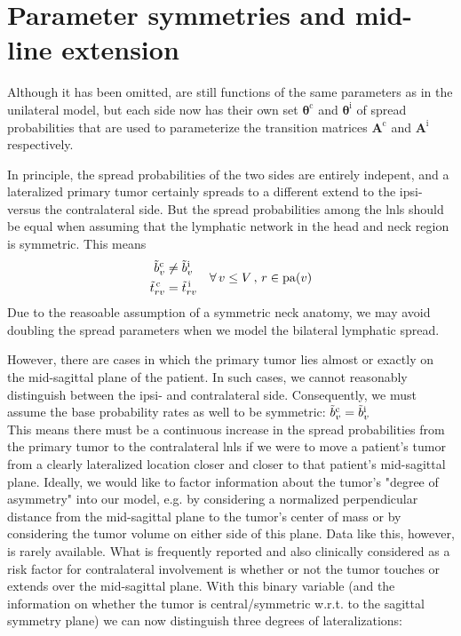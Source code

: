 \documentclass[\relativeRoot/main.tex]{subfiles}
\begin{document}
\section{Parameter symmetries and mid-line extension}
\label{sec:bilateral:parameter_symmetries}

Although it has been omitted,  are still functions of the same parameters as in the unilateral model, but each side now has their own set $\boldsymbol{\theta}^\text{c}$ and $\boldsymbol{\theta}^\text{i}$ of spread probabilities that are used to parameterize the transition matrices $\mathbf{A}^\text{c}$ and $\mathbf{A}^\text{i}$ respectively.

In principle, the spread probabilities of the two sides are entirely indepent, and a lateralized primary tumor certainly spreads to a different extend to the ipsi- versus the contralateral side. But the spread probabilities among the \glspl{lnl} should be equal when assuming that the lymphatic network in the head and neck region is symmetric. This means
%
\begin{equation}
    \begin{aligned}
        \Tilde{b}^\text{c}_v &\neq \Tilde{b}^\text{i}_v \\
        \Tilde{t}^\text{\,c}_{rv} &= \Tilde{t}^\text{\,i}_{rv}
    \end{aligned}
    \quad \forall \, v \leq V \, , \, r \in \operatorname{pa}(v)
\end{equation}
%
Due to the reasoable assumption of a symmetric neck anatomy, we may avoid doubling the spread parameters when we model the bilateral lymphatic spread.

However, there are cases in which the primary tumor lies almost or exactly on the mid-sagittal plane of the patient. In such cases, we cannot reasonably distinguish between the ipsi- and contralateral side. Consequently, we must assume the base probability rates as well to be symmetric: $\Tilde{b}^\text{c}_v = \Tilde{b}^\text{i}_v$ \\
This means there must be a continuous increase in the spread probabilities from the primary tumor to the contralateral \glspl{lnl} if we were to move a patient's tumor from a clearly lateralized location closer and closer to that patient's mid-sagittal plane. Ideally, we would like to factor information about the tumor's "degree of asymmetry" into our model, e.g. by considering a normalized perpendicular distance from the mid-sagittal plane to the tumor's center of mass or by considering the tumor volume on either side of this plane. Data like this, however, is rarely available. What is frequently reported and also clinically considered as a risk factor for contralateral involvement is whether or not the tumor touches or extends over the mid-sagittal plane. With this binary variable (and the information on whether the tumor is central/symmetric w.r.t. to the sagittal symmetry plane) we can now distinguish three degrees of lateralizations:
\end{document}
